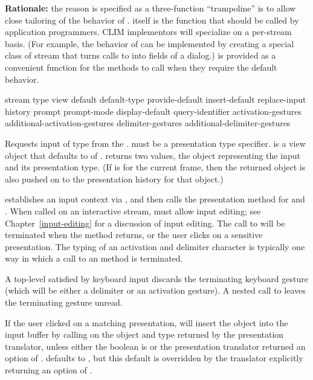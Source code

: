 {\bf Rationale:} the reason  is specified as a three-function
``trampoline'' is to allow close tailoring of the behavior of .
 itself is the function that should be called by application
programmers.  CLIM implementors will specialize  on a
per-stream basis.  (For example, the behavior of  can be
implemented by creating a special class of stream that turns calls to
 into fields of a dialog.)   is provided as a
convenient function for the  methods to call when they require
the default behavior.

 {stream type
                   \key view 
                        default default-type provide-default 
                        insert-default replace-input history
                        prompt prompt-mode display-default query-identifier
                        activation-gestures additional-activation-gestures
                        delimiter-gestures additional-delimiter-gestures}

Requests input of type  from the  .
 must be a presentation type specifier.   is a view object
that defaults to  of .  
returns two values, the object representing the input and its presentation type.
(If  is  for the current
frame, then the returned object is also pushed on to the presentation history
for that object.)

 establishes an input context via , and then
calls the  presentation method for  and .  When
called on an interactive stream,  must allow input editing; see
Chapter~\ref{input-editing} for a discussion of input editing.  The call to
 will be terminated when the  method returns, or the user
clicks on a sensitive presentation.  The typing of an activation and delimiter
character is typically one way in which a call to an  method is
terminated.

A top-level  satisfied by keyboard input discards the terminating
keyboard gesture (which will be either a delimiter or an activation gesture).
A nested call to  leaves the terminating gesture unread.

If the user clicked on a matching presentation,  will insert
the object into the input buffer by calling  on
the object and type returned by the presentation translator, unless either the
boolean  is  or the presentation translator
returned an  option of .   defaults to
, but this default is overridden by the translator explicitly
returning an  option of .

